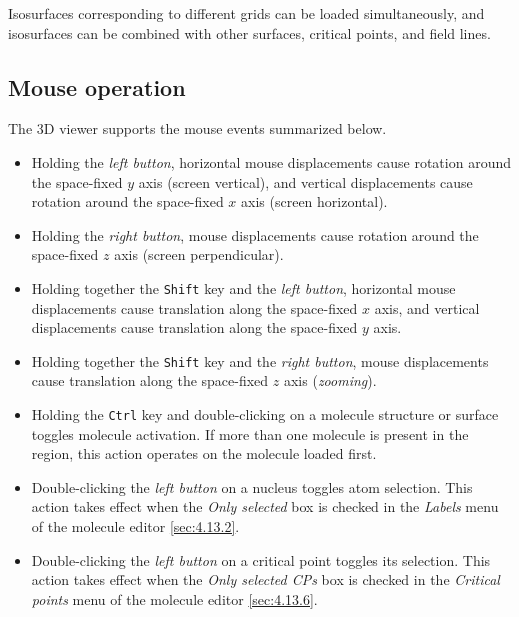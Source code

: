 \documentclass[10pt]{article}
\begin{document}
Isosurfaces corresponding to different grids 
can be loaded simultaneously, and isosurfaces can be combined with other surfaces, critical points,
and field lines.

\subsection{Mouse operation \label{sec:4.14}}

The 3D viewer supports the mouse events summarized below.

\begin{itemize}
\item Holding the {\it left button}, horizontal mouse displacements cause
rotation around the space-fixed $y$ axis (screen vertical), and vertical displacements cause rotation
around the space-fixed $x$ axis (screen horizontal).

\item Holding the {\it right button}, mouse displacements cause
rotation around the space-fixed $z$ axis (screen perpendicular).

\item Holding together the \texttt{Shift} key and the {\it left button}, horizontal
mouse displacements cause translation along the space-fixed $x$ axis, and
vertical displacements cause translation along the space-fixed $y$ axis.

\item Holding together the \texttt{Shift} key and the {\it right button}, mouse
displacements cause translation along the space-fixed $z$ axis ({\it zooming}).

\item Holding the \texttt{Ctrl} key and double-clicking on a molecule structure or surface toggles molecule activation. If more than one molecule is present in the region, this action
operates on the molecule loaded first.

\item Double-clicking the {\it left button} on a nucleus toggles atom selection. This action takes effect 
when the {\it Only selected} box is checked in the {\it Labels} menu of the molecule editor \ref{sec:4.13.2}.

\item Double-clicking the {\it left button} on a critical 
point
toggles its selection. This action takes effect 
when the {\it Only selected CPs} box is checked in the {\it Critical points} menu of the molecule editor \ref{sec:4.13.6}.


\end{itemize}
\end{document}
